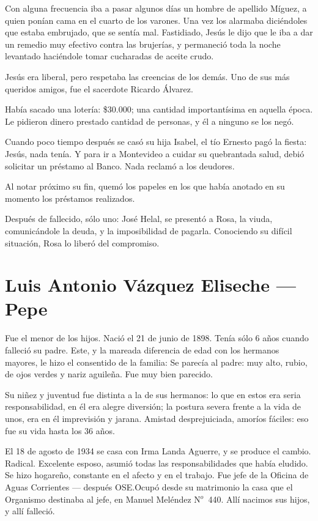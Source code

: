 \documentclass[a4paper]{article}
\begin{document}
Con alguna frecuencia iba a pasar algunos días un hombre de apellido Mí\-guez, a quien ponían cama en el cuarto de los varones. Una vez los alarmaba di\-cién\-do\-les que estaba embrujado, que se sentía mal. Fastidiado, Jesús le dijo que le iba a dar un remedio muy efectivo contra las brujerías, y permaneció toda la noche levantado haciéndole tomar cucharadas de aceite crudo.

\bigbreak{} 

Jesús era liberal, pero respetaba las creencias de los demás. Uno de sus más queridos amigos, fue el sacerdote Ricardo Álvarez.

\bigbreak{}

Había sacado una lotería: \$30.000; una cantidad importantísima en aquella época. Le pidieron dinero prestado cantidad de personas, y él a ninguno se los negó.

Cuando poco tiempo después se casó su hija Isabel, el tío Ernesto pagó la fiesta: Jesús, nada tenía. Y para ir a Montevideo a cuidar su quebrantada salud, debió solicitar un préstamo al Banco. Nada reclamó a los deudores.

Al notar próximo su fin, quemó los papeles en los que había anotado en su momento los préstamos realizados.

Después de fallecido, sólo uno: José Helal, se presentó a Rosa, la viuda, comunicándole la deuda, y la imposibilidad de pagarla. Conociendo su difícil situación, Rosa lo liberó del compromiso.


\section{Luis Antonio Vázquez Eliseche --- Pepe}

Fue el menor de los hijos. Nació el 21 de junio de 1898. Tenía sólo 6 años cuando falleció su padre. Este, y la mareada diferencia de edad con los hermanos mayores, le hizo el consentido de la familia: Se parecía al padre: muy alto, rubio, de ojos verdes y nariz aguileña. Fue muy bien parecido.

Su niñez y juventud fue distinta a la de sus hermanos: lo que en estos era seria responsabilidad, en él era alegre diversión; la postura severa frente a la vida de unos, era en él imprevisión y jarana. Amistad desprejuiciada, amoríos fáciles: eso fue su vida hasta los 36 años.

El 18 de agosto de 1934 se casa con Irma Landa Aguerre, y se produce el cambio. Radical. Excelente esposo, asumió todas las responsabilidades que había eludido. Se hizo hogareño, constante en el afecto y en el trabajo. Fue jefe de la Oficina de Aguas Corrientes --- después OSE.\@ Ocupó desde su matrimonio la casa que el Organismo destinaba al jefe, en Manuel Meléndez N$^o$~440. Allí nacimos sus hijos, y allí falleció.
\end{document}
